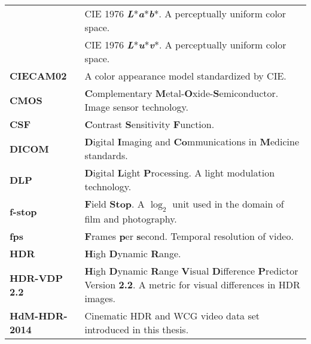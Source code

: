 \begin{flushleft}
\begin{longtable}[c]{@{}p{28.5mm}@{} p{120.5mm}}
	\textbf{\Lab}	& CIE 1976 \textbf{\textit{L}}*\textbf{\textit{a}}*\textbf{\textit{b}}*. A perceptually uniform color space.\\
	\textbf{\Luv}	& CIE 1976 \textbf{\textit{L}}*\textbf{\textit{u}}*\textbf{\textit{v}}*. A perceptually uniform color space.\\
	\textbf{CIECAM02}	& A color appearance model standardized by CIE.\\
	\textbf{CMOS}	& \textbf{C}omplementary \textbf{M}etal-\textbf{O}xide-\textbf{S}emiconductor. Image sensor technology.\\
	\textbf{CSF}	& \textbf{C}ontrast \textbf{S}ensitivity \textbf{F}unction.\\
	\textbf{DICOM}	& \textbf{D}igital \textbf{I}maging and \textbf{Co}mmunications in \textbf{M}edicine standards.\\
	\textbf{DLP}	& \textbf{D}igital \textbf{L}ight \textbf{P}rocessing. A light modulation technology.\\	
	\textbf{f-stop}	& \textbf{F}ield \textbf{Stop}. A $\log_2$ unit used in the domain of film and photography.\\
	\textbf{fps}	& \textbf{F}rames \textbf{p}er \textbf{s}econd. Temporal resolution of video.\\
	\textbf{HDR}	& \textbf{H}igh \textbf{D}ynamic \textbf{R}ange.\\ 
	\textbf{HDR-VDP 2.2}	& \textbf{H}igh \textbf{D}ynamic \textbf{R}ange \textbf{V}isual \textbf{D}ifference \textbf{P}redictor Version \textbf{2.2}. A metric for visual differences in HDR images.\\
	\textbf{HdM-HDR-2014}	& Cinematic HDR and WCG video data set introduced in this thesis.\\

\end{longtable}
\end{flushleft}
